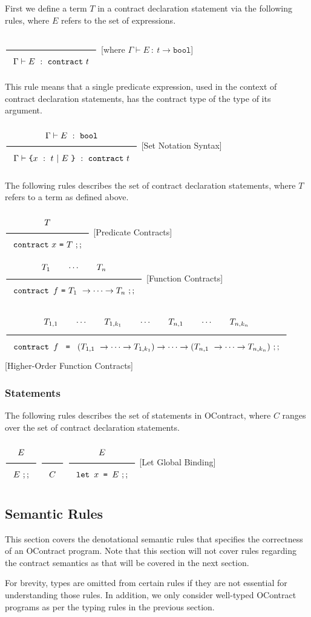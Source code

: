 \documentclass[a4paper]{article}
\newcommand{\Rule}[2]{\genfrac{}{}{0.7pt}{}{{\setlength{\fboxrule}{0pt}\setlength{\fboxsep}{3mm}\fbox{$#1$}}}{{\setlength{\fboxrule}{0pt}\setlength{\fboxsep}{3mm}\fbox{$#2$}}}}
\newcommand{\Contract}{\texttt{contract}}
\newcommand{\Bool}{\texttt{bool}}
\newcommand{\Rb}{\texttt{\}}}
\newcommand{\Lb}{\texttt{\{}}
\begin{document}
First we define a term $T$ in a contract declaration statement via the following rules, where $E$ refers to the set of expressions.

$\Rule{}{\Gamma \vdash E\ :\ \Contract\ t}$ [where $\Gamma \vdash E\ :\ t \rightarrow \Bool$]

This rule means that a single predicate expression, used in the context of contract declaration statements, has the contract type of the type of its argument.

$\Rule{\Gamma \vdash E\ :\ \Bool}{\Gamma \vdash \Lb x\ :\ t\ |\ E\ \Rb\ :\ \Contract\ t}$ [Set Notation Syntax]

The following rules describes the set of contract declaration statements, where $T$ refers to a term as defined above.

$\Rule{T}{\Contract\ x\ \texttt{=}\ T\ ;;}$ [Predicate Contracts]
\hfill
$\Rule{T_1 \qquad \cdots \qquad T_n}{\texttt{contract } f\ \texttt{=}\ T_1\ \rightarrow \cdots \rightarrow T_n\ ;;}$ [Function Contracts]

$\Rule{T_{1,1} \qquad \cdots \qquad T_{1,k_1} \qquad \cdots \qquad T_{n,1} \qquad \cdots \qquad T_{n,k_n}}
{\texttt{contract } f\ \texttt{ = }\ (T_{1,1}\ \rightarrow \cdots \rightarrow T_{1,k_1}) \rightarrow \cdots \rightarrow (T_{n,1}\ \rightarrow \cdots \rightarrow T_{n,k_n})\ ;;}$ [Higher-Order Function Contracts]

\subsubsection{Statements}

The following rules describes the set of statements in OContract, where $C$ ranges over the set of contract declaration statements.

$\Rule{E}{E\ ;;}$
\hfill
$\Rule{}{C}$
\hfill
$\Rule{E}{\texttt{let } x \texttt{ = } E\ ;;}$ [Let Global Binding]

\subsection{Semantic Rules}

This section covers the denotational semantic rules that specifies the correctness of an OContract program.
Note that this section will not cover rules regarding the contract semantics as that will be covered in the next section.

For brevity, types are omitted from certain rules if they are not essential for understanding those rules.
In addition, we only consider well-typed OContract programs as per the typing rules in the previous section.
\end{document}
